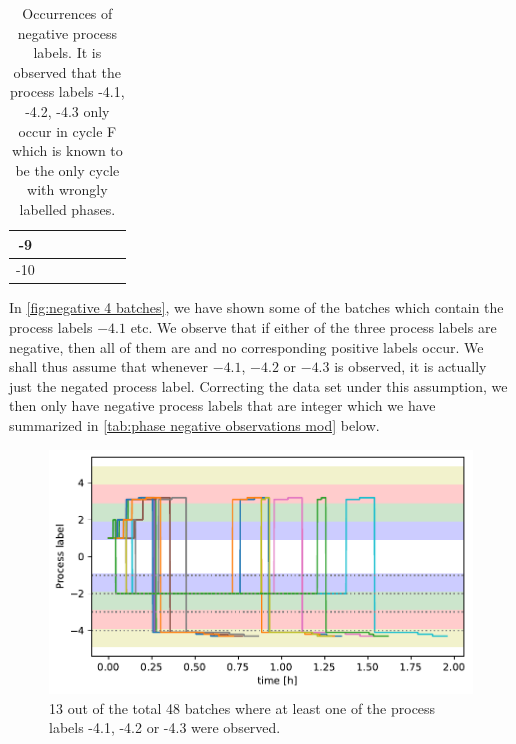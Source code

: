 \documentclass[../Thesis.tex]{subfiles}
\begin{document}
\begin{table}[h]
\begin{tabular}{c|c|c|c|c|c|c}
        -9                     &                      &                      &                      & \cellcolor{black!50} & \cellcolor{black!50} & \cellcolor{black!50} \\\hline
        -10                    &                      & \cellcolor{black!50} &                      & \cellcolor{black!50} & \cellcolor{black!50} & \cellcolor{black!50}
    \end{tabular}
    \caption{Occurrences of negative process labels. It is observed that the process labels -4.1, -4.2, -4.3 only occur in cycle F which is known to be the only cycle with wrongly labelled phases.}
    \label{tab:phase negative observations}
\end{table}

In \autoref{fig:negative 4 batches}, we have shown some of the batches which contain the process labels $-4.1$ etc. We observe that if either of the three process labels are negative, then all of them are and no corresponding positive labels occur. We shall thus assume that whenever $-4.1$, $-4.2$ or $-4.3$ is observed, it is actually just the negated process label. Correcting the data set under this assumption, we then only have negative process labels that are integer which we have summarized in \autoref{tab:phase negative observations mod} below.
\begin{figure}[H]
    \centering
    \includegraphics[width=.83\linewidth]{figures/Multiple cycles data/Adding of solids/sample negative sub 4 phases.pdf}
    \caption{13 out of the total 48 batches where at least one of the process labels -4.1, -4.2 or -4.3 were observed.}
    \label{fig:negative 4 batches}
\end{figure}
\end{document}
